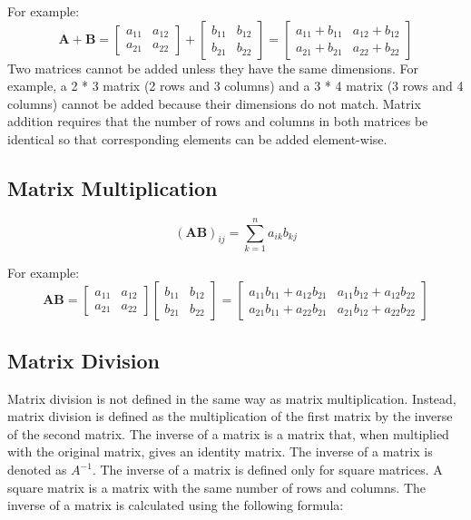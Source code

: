 \documentclass[11pt]{article}
\begin{document}
For example:
    \[
\mathbf{A} + \mathbf{B} =
\begin{bmatrix}
a_{11} & a_{12} \\
a_{21} & a_{22}
\end{bmatrix}
+
\begin{bmatrix}
b_{11} & b_{12} \\
b_{21} & b_{22}
\end{bmatrix}
=
\begin{bmatrix}
a_{11} + b_{11} & a_{12} + b_{12} \\
a_{21} + b_{21} & a_{22} + b_{22}
\end{bmatrix}
\]
Two matrices cannot be added unless they have the same dimensions.
For example, a 2 * 3 matrix (2 rows and 3 columns) and a 3 * 4 matrix (3 rows and 4 columns) cannot be added because their dimensions do not match.
    Matrix addition requires that the number of rows and columns in both matrices be identical so that corresponding elements can be added element-wise.


    \subsection{Matrix Multiplication}

    \[
(\mathbf{A} \mathbf{B})_{ij} = \sum_{k=1}^{n} a_{ik} b_{kj}
\]

For example:
    \[
\mathbf{A} \mathbf{B} =
\begin{bmatrix}
a_{11} & a_{12} \\
a_{21} & a_{22}
\end{bmatrix}
\begin{bmatrix}
b_{11} & b_{12} \\
b_{21} & b_{22}
\end{bmatrix}
=
\begin{bmatrix}
a_{11} b_{11} + a_{12} b_{21} & a_{11} b_{12} + a_{12} b_{22} \\
a_{21} b_{11} + a_{22} b_{21} & a_{21} b_{12} + a_{22} b_{22}
\end{bmatrix}
\]

    \subsection{Matrix Division}

    Matrix division is not defined in the same way as matrix multiplication. Instead, matrix division is defined as the multiplication of the first matrix by the inverse of the second matrix.
    The inverse of a matrix is a matrix that, when multiplied with the original matrix, gives an identity matrix. The inverse of a matrix is denoted as \( A^{-1} \). The inverse of a matrix is defined only for square matrices.
    A square matrix is a matrix with the same number of rows and columns. The inverse of a matrix is calculated using the following formula:
\end{document}
